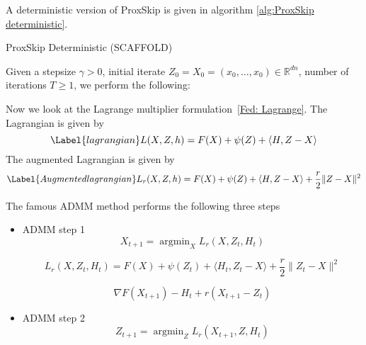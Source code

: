 \begin{itemize}
A deterministic version of ProxSkip is given in algorithm \ref{alg:ProxSkip deterministic}. 

\begin{algorithm}
\caption{ProxSkip Deterministic (SCAFFOLD)}\label{alg:ProxSkip deterministic}
Given a stepsize $\gamma > 0$, initial iterate $Z_0 = X_0 = (x_0, \dots, x_0) \in \mathbb{R}^{dn}$, number of iterations $T \geq 1$, we perform the following:  
\begin{algorithmic}
    \EndFor    
\EndFor
\end{algorithmic}
\end{algorithm}

Now we look at the Lagrange multiplier formulation~\eqref{Fed: Lagrange}. The Lagrangian is given by 
\begin{equation}\Label{lagrangian}
    L(X,Z,h) = F(X) +\psi(Z) + \langle H,Z-X \rangle
\end{equation}
The augmented Lagrangian is given by 
\begin{equation}\Label{Augmented lagrangian}
    L_r(X,Z,h) = F(X) +\psi(Z) + \langle H,Z-X \rangle + \frac{r}{2} \|Z-X \|^2
\end{equation}

The famous ADMM method performs the following three steps
\begin{itemize} 
    \item ADMM step 1
    \begin{equation}
        X_{t+1} = \mathop{ \arg \min }_{X} L_r({X,Z_{t}, H_t})
    \end{equation} 
    
    \begin{equation}
    L_r(X,Z_t,H_t) = F(X) +\psi(Z_t) + \langle H_t,Z_t-X \rangle + \frac{r}{2} \|Z_t-X \|^2
    \end{equation}
    
    \begin{equation}
        \nabla F(X_{t+1}) - H_t + r (X_{t+1} - Z_t)
    \end{equation}

    \item ADMM step 2
    \begin{equation}
        Z_{t+1} = \mathop{ \arg \min }_{Z} L_r({X_{t+1},Z, H_t})
    \end{equation}
    

\end{itemize}
\end{itemize}

